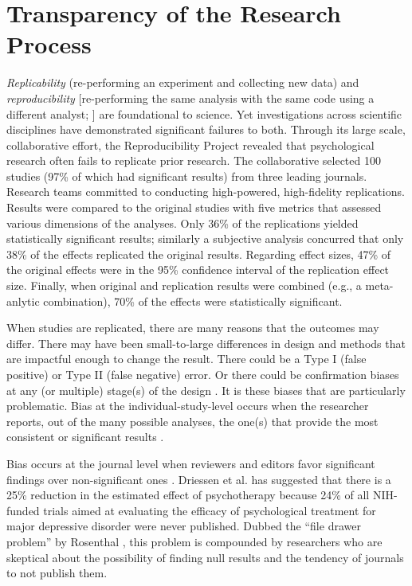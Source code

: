 \documentclass[
  11pt,
]{book}
\begin{document}
\section{Transparency of the Research Process}\label{transparency-of-the-research-process}

\emph{Replicability} (re-performing an experiment and collecting new data) and \emph{reproducibility} {[}re-performing the same analysis with the same code using a different analyst; \citet{patil_statistical_2016}{]} are foundational to science. Yet investigations across scientific disciplines have demonstrated significant failures to both. Through its large scale, collaborative effort, the Reproducibility Project \citep{open_science_collaboration_estimating_2015} revealed that psychological research often fails to replicate prior research. The collaborative selected 100 studies (97\% of which had significant results) from three leading journals. Research teams committed to conducting high-powered, high-fidelity replications. Results were compared to the original studies with five metrics that assessed various dimensions of the analyses. Only 36\% of the replications yielded statistically significant results; similarly a subjective analysis concurred that only 38\% of the effects replicated the original results. Regarding effect sizes, 47\% of the original effects were in the 95\% confidence interval of the replication effect size. Finally, when original and replication results were combined (e.g., a meta-anlytic combination), 70\% of the effects were statistically significant.

When studies are replicated, there are many reasons that the outcomes may differ. There may have been small-to-large differences in design and methods that are impactful enough to change the result. There could be a Type I (false positive) or Type II (false negative) error. Or there could be confirmation biases at any (or multiple) stage(s) of the design \citep{stevens_replicability_2017}. It is these biases that are particularly problematic. Bias at the individual-study-level occurs when the researcher reports, out of the many possible analyses, the one(s) that provide the most consistent or significant results \citep{hengartner_raising_2018, vantveer_pre-registration_2016}.

Bias occurs at the journal level when reviewers and editors favor significant findings over non-significant ones \citep{stevens_replicability_2017}. Driessen et al. \citeyearpar{driessen_does_2015} has suggested that there is a 25\% reduction in the estimated effect of psychotherapy because 24\% of all NIH-funded trials aimed at evaluating the efficacy of psychological treatment for major depressive disorder were never published. Dubbed the ``file drawer problem'' by Rosenthal \citeyearpar{rosenthal_file_1979}, this problem is compounded by researchers who are skeptical about the possibility of finding null results and the tendency of journals to not publish them.
\end{document}
